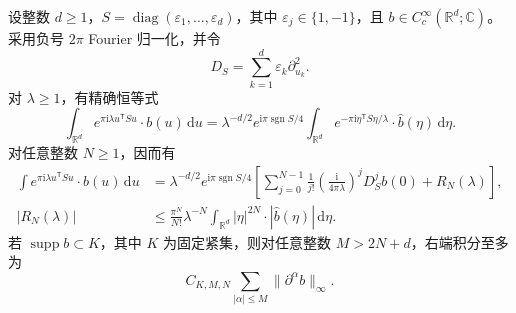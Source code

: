 \begin{proposition}[二次驻相展开]\label{b2:prop:21-quadratic-expansion}
设整数 \(d\geq1\)，\(S=\operatorname{diag}(\varepsilon_1,\ldots,\varepsilon_d)\)，其中 \(\varepsilon_j\in\{1,-1\}\)，且 \(b\in C_c^\infty(\mathbb R^d;\mathbb C)\)。采用负号 \(2\pi\) Fourier 归一化，并令
\[
 D_S=\sum_{k=1}^d\varepsilon_k\partial_{u_k}^2.
\]
对 \(\lambda\geq1\)，有精确恒等式
\begin{equation}\label{b2:eq:21-quadratic-fourier}
 \int_{\mathbb R^d}e^{\pi\mathrm i\lambda u^{\mathsf T}Su}
                 \cdot b(u)\,\mathrm du
 =\lambda^{-d/2}e^{\mathrm i\pi\operatorname{sgn}S/4}
   \int_{\mathbb R^d}e^{-\pi\mathrm i\eta^{\mathsf T}S\eta/\lambda}
                 \cdot\widehat b(\eta)\,\mathrm d\eta.
\end{equation}
对任意整数 \(N\geq1\)，因而有
\[
 \begin{aligned}
 \int e^{\pi\mathrm i\lambda u^{\mathsf T}Su}\cdot b(u)\,\mathrm du
 &=\lambda^{-d/2}e^{\mathrm i\pi\operatorname{sgn}S/4}
   \left[
   \sum_{j=0}^{N-1}\frac1{j!}
     \left(\frac{\mathrm i}{4\pi\lambda}\right)^j
     D_S^jb(0)+R_N(\lambda)
   \right],\\
 |R_N(\lambda)|
 &\leq\frac{\pi^N}{N!}\lambda^{-N}
      \int_{\mathbb R^d}|\eta|^{2N}\cdot
                        |\widehat b(\eta)|\,\mathrm d\eta.
 \end{aligned}
\]
若 \(\operatorname{supp}b\subset K\)，其中 \(K\) 为固定紧集，则对任意整数 \(M>2N+d\)，右端积分至多为
\[
 C_{K,M,N}\sum_{|\alpha|\leq M}
                    \|\partial^\alpha b\|_\infty.
\]
\end{proposition}
